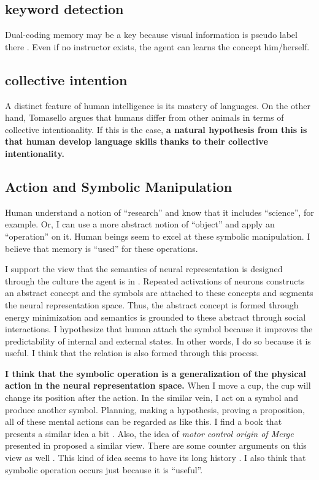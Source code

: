 \documentclass[12pt]{article}
\begin{document}
\subsection{keyword detection}
Dual-coding memory may be a key because visual information is pseudo label there \cite{Hill21}.
Even if no instructor exists, the agent can learns the concept him/herself.

\subsection{collective intention}
A distinct feature of human intelligence is its mastery of languages. On the other hand, 
Tomasello argues that humans differ from other animals in terms of collective intentionality.
If this is the case, \textbf{a natural hypothesis from this is that human develop language skills 
thanks to their collective intentionality.}

\subsection{Action and Symbolic Manipulation}
Human understand a notion of ``research'' and know that it includes ``science'', for example. 
Or, I can use a more abstract notion of ``object'' and apply an ``operation'' on it. Human beings 
seem to excel at these symbolic manipulation. I believe that memory is ``used'' for these operations. 

I support the view that the semantics of neural representation is designed through the culture 
the agent is in \cite{Santoro21}. Repeated activations of neurons constructs an abstract concept 
and the symbols are attached to these concepts and segments the neural representation space. 
Thus, the abstract concept is formed through energy minimization and semantics is grounded to these 
abstract through social interactions. I hypothesize that human attach the symbol because it 
improves the predictability of internal and external states. In other words, I do so 
because it is useful. I think that the relation is also formed through this process.

\textbf{I think that the symbolic operation is a generalization 
of the physical action in the neural representation space.} When I move a cup, the cup will change 
its position after the action. In the similar vein, I act on a symbol and produce another symbol. 
Planning, making a hypothesis, proving a proposition, all of these mental actions can be 
regarded as like this. I find a book that presents a similar idea a bit \cite{Hawkins21}. 
Also, the idea of \textit{motor control origin of Merge} presented in \cite{Fujita14,Fujita17} 
proposed a similar view. There are some counter arguments on this view as well \cite{Zaccarella21}. 
This kind of idea seems to have its long history \cite{Lashley51,Greenfield91}. I also think that symbolic operation occurs just because it is ``useful''.
\end{document}

